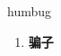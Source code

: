 
\begin{frame}
{\huge humbug}
\begin{center}
\begin{enumerate}\Large
  \item \textbf{骗子}
\end{enumerate}
\end{center}
\end{frame}
